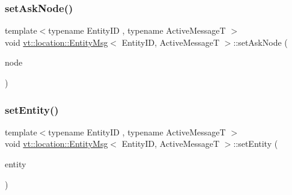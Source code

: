 \mbox{\label{structvt_1_1location_1_1_entity_msg_a42166a96c86f14d91cf378ff2e315db6}} 
\subsubsection{\texorpdfstring{set\+Ask\+Node()}{setAskNode()}}
{\footnotesize\ttfamily template$<$typename Entity\+ID , typename Active\+MessageT $>$ \\
void \hyperlink{structvt_1_1location_1_1_entity_msg}{vt\+::location\+::\+Entity\+Msg}$<$ Entity\+ID, Active\+MessageT $>$\+::set\+Ask\+Node (\begin{DoxyParamCaption}\item[{\hyperlink{namespacevt_a866da9d0efc19c0a1ce79e9e492f47e2}{Node\+Type} const \&}]{node }\end{DoxyParamCaption})\hspace{0.3cm}{\ttfamily [inline]}}

\mbox{\label{structvt_1_1location_1_1_entity_msg_a76a6b14309f9a20a0b6cd2afa9a80917}} 
\subsubsection{\texorpdfstring{set\+Entity()}{setEntity()}}
{\footnotesize\ttfamily template$<$typename Entity\+ID , typename Active\+MessageT $>$ \\
void \hyperlink{structvt_1_1location_1_1_entity_msg}{vt\+::location\+::\+Entity\+Msg}$<$ Entity\+ID, Active\+MessageT $>$\+::set\+Entity (\begin{DoxyParamCaption}\item[{Entity\+ID const \&}]{entity }\end{DoxyParamCaption})\hspace{0.3cm}{\ttfamily [inline]}}

\mbox{\label{structvt_1_1location_1_1_entity_msg_af3c49e5e6d894d29984bf9ebf3983717}} 
